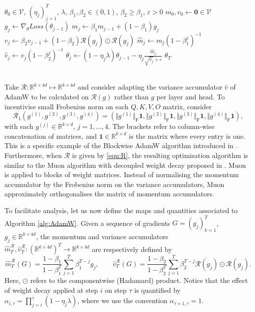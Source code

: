 \documentclass{article}
\newcommand{\R}{\mathbb{R}}
\begin{document}
\begin{appendices}
\begin{algorithm}
\begin{algorithmic}[1]
\Require $\theta_0 \in \mathscr{V}$, $(\eta_j)_{j=1}^T$, $\lambda$, $\beta_1,\beta_2 \in (0,1)$, $\beta_2 \ge \beta_1$, $ \varepsilon>0$
\State $m_0 ,v_0 \gets \bm{0} \in \mathscr{V}$
    \State $g_j\gets \nabla_{\theta}Loss(\theta_{j-1})$
    \State $m_j\gets \beta_1 m_{j-1}+(1-\beta_1)g_j$ \qquad $v_j \gets \beta_2 v_{j-1} + (1 -\beta_2)\mathcal R (g_j)\odot \mathcal R(g_j)$
\State $\hat m_j \gets m_j(1-\beta_1^j)^{-1}$\qquad $\hat v_j \gets v_j(1-\beta_2^j)^{-1}$
\State  $\theta_{j}\gets (1-\eta_j\lambda)\theta_{j-1}-\eta_j\frac{\hat m_j}{\sqrt{\hat v_j}+ \varepsilon}$
\EndFor
\State\Return $\theta_T$
\end{algorithmic}
\end{algorithm}\\
Take $\mathcal R: \R^{k\times 4d}\mapsto \R^{k\times 4d}$ and consider adapting the variance accumulator $\hat v$ of AdamW to be calculated on $\mathcal R(g)$ rather than $g$ per layer and head. To incentivise small Frobenius norm on each $Q,K,V,O$ matrix, consider
\begin{equation}\label{eqn:R}
    \mathcal R_1(g^{(1)},g^{(2)},g^{(3)},g^{(4)}) = \left(\Vert g^{(1)} \Vert_\mathrm{F}\bm{1},\Vert g^{(2)} \Vert_\mathrm{F}\bm{1},\Vert g^{(3)}\Vert_\mathrm{F}\bm{1},\Vert g^{(4)} \Vert_\mathrm{F}\bm{1}\right), 
\end{equation}
with each $g^{(j)}\in \R^{k\times d}$, $j=1,\ldots,4$. The brackets refer to column-wise concatenation of matrices, and $\bm{1}\in\R^{k\times d}$ is the matrix where every entry is one. This is a specific example of the Blockwise AdamW algorithm introduced in \cite{xie2024adam}. Furthermore, when $\mathcal R$ is given by \eqref{eqn:R}, the resulting optimisation algorithm is similar to the Muon algorithm with decoupled weight decay proposed in \cite{liu2025muon}. Muon is applied to blocks of weight matrices. Instead of normalising the momentum accumulator by the Frobenius norm on the variance accumulators, Muon approximately orthogonalises the matrix of momentum accumulators.

To facilitate analysis, let us now define the maps and quantities associated to Algorithm \ref{alg:AdamW}.
 Given a sequence of gradients $G=(g_j)_{k=1}^T$, $g_j\in \R^{k\times 4d}$, the momentum and variance accumulators $\hat m^\mathcal R_T,\hat v^\mathcal R_T: (\R^{k\times 4d})^T\to \R^{k\times 4d}$ are respectively defined by
\begin{equation}\label{eqn:AdamWalg}
    \hat m^\mathcal R_T(G) = \frac{1-\beta_1}{1-\beta_1^T}\sum_{j=1}^{T}\beta_1^{T-j}g_j,\qquad \hat v^\mathcal R_T(G) = \frac{1-\beta_2}{1-\beta_2^T}\sum_{j=1}^{T}\beta_2^{T-j}\mathcal R(g_j)\odot \mathcal R(g_j).
\end{equation}
Here, $\odot$ refers to the componentwise (Hadamard) product. Notice that the effect of weight decay applied at step $i$ on step $\tau$ is quantified by $\alpha_{i,\tau}=\prod_{j=i}^\tau(1-\eta_j\lambda)$, where we use the convention $\alpha_{\tau+1,\tau}=1$. 


\end{appendices}
\end{document}
